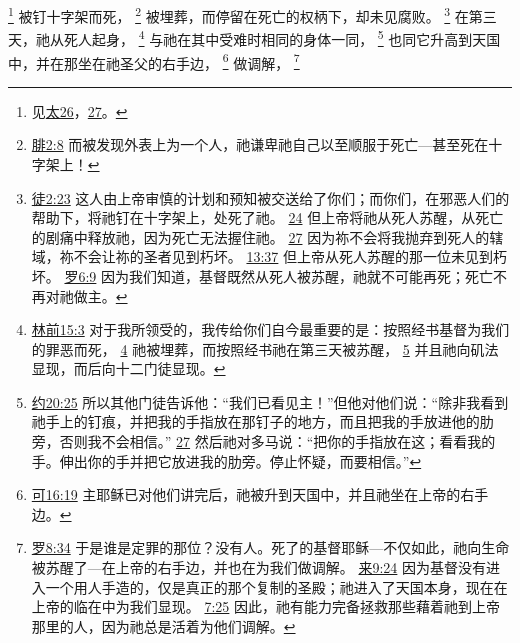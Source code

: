 \documentclass[12pt, a4paper, oneside]{ctexart}
\begin{document}
	\footnote {
		见\href{https://biblehub.com/niv/matthew/26.htm}{太26}，\href{https://biblehub.com/niv/matthew/26.htm}{27}。
	}
	被钉十字架而死，
	\footnote {
		\href{https://biblehub.com/philippians/2-8.htm}{腓2:8} 而被发现外表上为一个人，祂谦卑祂自己以至顺服于死亡---甚至死在十字架上！
	}
	被埋葬，而停留在死亡的权柄下，却未见腐败。
	\footnote {
		\href{https://biblehub.com/acts/2-23.htm}{徒2:23} 这人由上帝审慎的计划和预知被交送给了你们；而你们，在邪恶人们的帮助下，将祂钉在十字架上，处死了祂。
		\href{https://biblehub.com/acts/2-24.htm}{24} 但上帝将祂从死人苏醒，从死亡的剧痛中释放祂，因为死亡无法握住祂。
		\href{https://biblehub.com/acts/2-27.htm}{27} 因为祢不会将我抛弃到死人的辖域，祢不会让祢的圣者见到朽坏。
		\href{https://biblehub.com/acts/13-37.htm}{13:37} 但上帝从死人苏醒的那一位未见到朽坏。
		\href{https://biblehub.com/romans/6-9.htm}{罗6:9} 因为我们知道，基督既然从死人被苏醒，祂就不可能再死；死亡不再对祂做主。
	}
	在第三天，祂从死人起身，
	\footnote {
		\href{https://biblehub.com/1_corinthians/15-3.htm}{林前15:3} 对于我所领受的，我传给你们自今最重要的是：按照经书基督为我们的罪恶而死，
		\href{https://biblehub.com/1_corinthians/15-4.htm}{4} 祂被埋葬，而按照经书祂在第三天被苏醒，
		\href{https://biblehub.com/1_corinthians/15-5.htm}{5} 并且祂向矶法显现，而后向十二门徒显现。
	}
	与祂在其中受难时相同的身体一同，
	\footnote {
		\href{https://biblehub.com/john/20-25.htm}{约20:25} 所以其他门徒告诉他：“我们已看见主！”但他对他们说：“除非我看到祂手上的钉痕，并把我的手指放在那钉子的地方，而且把我的手放进他的肋旁，否则我不会相信。”
		\href{https://biblehub.com/john/20-27.htm}{27} 然后祂对多马说：“把你的手指放在这；看看我的手。伸出你的手并把它放进我的肋旁。停止怀疑，而要相信。”
	}
	也同它升高到天国中，并在那坐在祂圣父的右手边，
	\footnote {
		\href{https://biblehub.com/mark/16-19.htm}{可16:19} 主耶稣已对他们讲完后，祂被升到天国中，并且祂坐在上帝的右手边。
	}
	做调解，
	\footnote {
		\href{https://biblehub.com/romans/8-34.htm}{罗8:34} 于是谁是定罪的那位？没有人。死了的基督耶稣---不仅如此，祂向生命被苏醒了---在上帝的右手边，并也在为我们做调解。
		\href{https://biblehub.com/hebrews/9-24.htm}{来9:24} 因为基督没有进入一个用人手造的，仅是真正的那个复制的圣殿；祂进入了天国本身，现在在上帝的临在中为我们显现。
		\href{https://biblehub.com/hebrews/7-25.htm}{7:25} 因此，祂有能力完备拯救那些藉着祂到上帝那里的人，因为祂总是活着为他们调解。
	}
\end{document}
